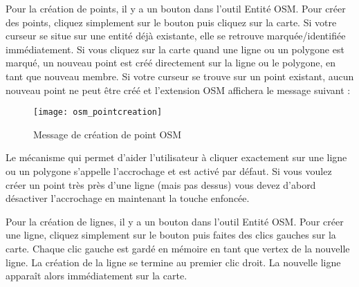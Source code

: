 Pour la création de points, il y a un bouton  dans l'outil Entité OSM. Pour créer des points, cliquez simplement sur le bouton puis cliquez sur la carte. Si votre curseur se situe sur une entité déjà existante, elle se retrouve marquée/identifiée immédiatement. Si vous cliquez sur la carte quand une ligne ou un polygone est marqué, un nouveau point est créé directement sur la ligne ou le polygone, en tant que nouveau membre. Si votre curseur se trouve sur un point existant, aucun nouveau point ne peut être créé et l'extension OSM affichera le message suivant :

\begin{figure}[ht]
   \centering
   \texttt{[image: osm\_pointcreation]}
   \caption{Message de création de point OSM \nixcaption}\label{fig:osmpoicreat}
\end{figure}

Le mécanisme qui permet d'aider l'utilisateur à cliquer exactement sur une ligne ou un polygone s'appelle l'accrochage et est activé par défaut. Si vous voulez créer un point très près d'une ligne (mais pas dessus) vous devez d'abord désactiver l'accrochage en maintenant la touche  enfoncée.


Pour la création de lignes, il y a un bouton  dans l'outil Entité OSM. Pour créer une ligne, cliquez simplement sur le bouton puis faites des clics gauches sur la carte. Chaque clic gauche est gardé en mémoire en tant que vertex de la nouvelle ligne. La création de la ligne se termine au premier clic droit. La nouvelle ligne apparaît alors immédiatement sur la carte.

